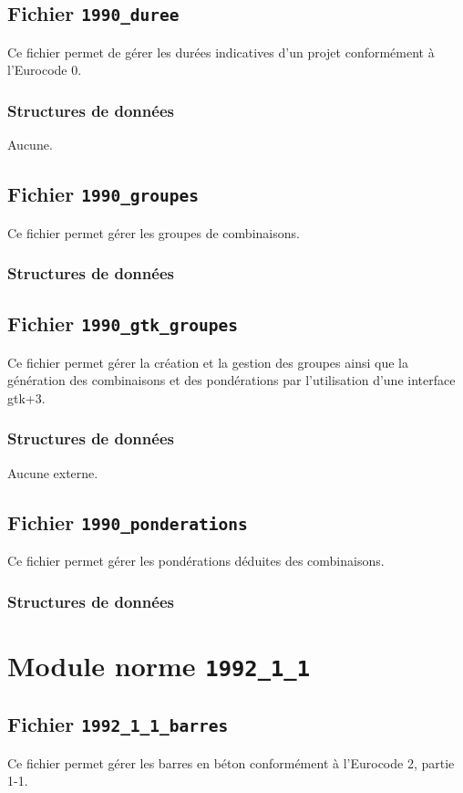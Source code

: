 \documentclass{article}
\begin{document}
\subsection{Fichier {\texttt{1990\_duree}}}
Ce fichier permet de gérer les durées indicatives d'un projet conformément à l'Eurocode 0.
\subsubsection{Structures de données}
Aucune.

\subsection{Fichier {\texttt{1990\_groupes}}}
Ce fichier permet gérer les groupes de combinaisons.
\subsubsection{Structures de données}


\subsection{Fichier {\texttt{1990\_gtk\_groupes}}}
Ce fichier permet gérer la création et la gestion des groupes ainsi que la génération des combinaisons et des pondérations par l'utilisation d'une interface gtk+3.
\subsubsection{Structures de données}
Aucune externe.


\subsection{Fichier {\texttt{1990\_ponderations}}}
Ce fichier permet gérer les pondérations déduites des combinaisons.
\subsubsection{Structures de données}


\section{Module norme {\texttt{1992\_1\_1}}}
\subsection{Fichier {\texttt{1992\_1\_1\_barres}}}
Ce fichier permet gérer les barres en béton conformément à l'Eurocode 2, partie 1-1.
\end{document}
